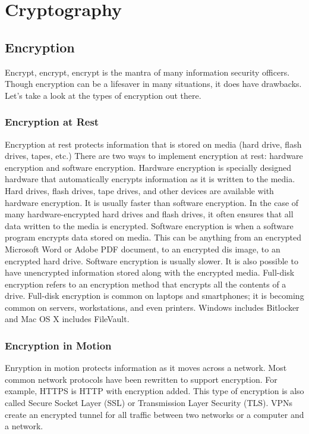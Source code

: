 \section{Cryptography}\label{sec:"Cryptography"}
\subsection{Encryption}
Encrypt, encrypt, encrypt is the mantra of many information security officers. Though encryption can be a lifesaver in many situations, it does have drawbacks. Let's take a look at the types of encryption out there.
\subsubsection{Encryption at Rest}
Encryption at rest protects information that is stored on media (hard drive, flash drives, tapes, etc.)
There are two ways to implement encryption at rest: hardware encryption and software encryption. Hardware encryption is specially designed hardware that automatically encrypts information as it is written to the media. Hard drives, flash drives, tape drives, and other devices are available with hardware encryption. It is usually faster than software encryption. In the case of many hardware-encrypted hard drives and flash drives, it often ensures that all data written to the media is encrypted.
Software encryption is when a software program encrypts data stored on media. This can be anything from an encrypted Microsoft Word or Adobe PDF document, to an encrypted dis image, to an encrypted hard drive. Software encryption is usually slower. It is also possible to have unencrypted information stored along with the encrypted media. Full-disk encryption refers to an encryption method that encrypts all the contents of a drive. Full-disk encryption is common on laptops and smartphones; it is becoming common on servers, workstations, and even printers. Windows includes Bitlocker and Mac OS X includes FileVault.
\subsubsection{Encryption in Motion}
Enryption in motion protects information as it moves across a network. Most common network protocols have been rewritten to support encryption. For example, HTTPS is HTTP with encryption added. This type of encryption is also called Secure Socket Layer (SSL) or Transmission Layer Security (TLS). VPNs create an encrypted tunnel for all traffic between two networks or a computer and a network.
